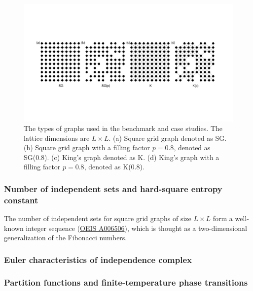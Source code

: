 \documentclass[onefignum, onetabnum]{siamart190516}
\newcommand{\<}{\langle}
\renewcommand{\>}{\rangle}
\begin{document}
\begin{figure}[t] 
    \centering
    \includegraphics[width=\textwidth, trim={0cm 0cm 0cm 0cm}, clip]{lattices.pdf}
    \caption{The types of graphs used in the benchmark and case studies.
    The lattice dimensions are $L\times L$. (a) Square grid graph denoted as SG. (b) Square grid graph with a filling factor $p=0.8$, denoted as SG(0.8).
    (c) King's graph denoted as K. (d) King's graph with a filling factor $p=0.8$, denoted as K(0.8).}
    \label{fig:lattices}
\end{figure}

\subsubsection{Number of independent sets and hard-square entropy constant}
The number of independent sets for square grid graphs of size $L \times L$ form a well-known integer sequence (\href{https://oeis.org/A006506}{OEIS A006506}), which is thought as a two-dimensional generalization of the Fibonacci numbers.

\subsubsection{Euler characteristics of independence complex}

\subsubsection{Partition functions and finite-temperature phase transitions}
\end{document}
